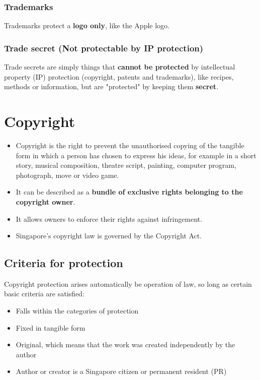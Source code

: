 \documentclass[11pt]{article}
\begin{document}
\subsubsection{Trademarks}
\label{sec:org0d60398}
Trademarks protect a \textbf{logo only}, like the Apple logo.

\subsubsection{Trade secret (Not protectable by IP protection)}
\label{sec:org9b01723}
Trade secrets are simply things that \textbf{cannot be protected} by intellectual property (IP) protection (copyright, patents and trademarks), like recipes, methods or information, but are "protected" by keeping them \textbf{secret}.


\section{Copyright}
\label{sec:org92bf3a7}
\begin{itemize}
\item Copyright is the right to prevent the unauthorised copying of the tangible form in which a person has chosen to express his ideas, for example in a short story, musical composition, theatre script, painting, computer program, photograph, move or video game.
\item It can be described as a \textbf{bundle of exclusive rights belonging to the copyright owner}.
\item It allows owners to enforce their rights against infringement.
\item Singapore's copyright law is governed by the Copyright Act.
\end{itemize}

\subsection{Criteria for protection}
\label{sec:org9002ca6}
Copyright protection arises automatically be operation of law, so long as certain basic criteria are satisfied:
\begin{itemize}
\item Falls within the categories of protection
\item Fixed in tangible form
\item Original, which means that the work was created independently by the author
\item Author or creator is a Singapore citizen or permanent resident (PR)
\end{itemize}
\end{document}
